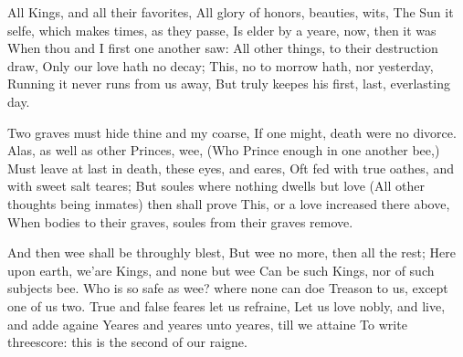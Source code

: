 \documentclass{book}
\newenvironment{poem}[1]%
  {\poemtitle{#1}%
   \Versus
   \numerus{1}%
  }
  {\endVersus}
\begin{document}
      
\begin{poem}{The Anniversarie} %
\Forma {}
    All Kings, and all their favorites,        
    All glory of honors, beauties, wits,        
  The Sun it selfe, which makes times, as they passe,  \auto
  Is elder by a yeare, now, then it was        
  When thou and I first one another saw:       
  All other things, to their destruction draw,        
    Only our love hath no decay;        
  This, no to morrow hath, nor yesterday,        
  Running it never runs from us away,        
  But truly keepes his first, last, everlasting day.       
       
    Two graves must hide thine and my coarse,        
    If one might, death were no divorce.        
  Alas, as well as other Princes, wee,        
  (Who Prince enough in one another bee,)        
  Must leave at last in death, these eyes, and eares,       
  Oft fed with true oathes, and with sweet salt teares;        
    But soules where nothing dwells but love        
  (All other thoughts being inmates) then shall prove        
  This, or a love increased there above,        
  When bodies to their graves, soules from their graves remove.       
       
    And then wee shall be throughly blest,        
    But wee no more, then all the rest;        
  Here upon earth, we'are Kings, and none but wee        
  Can be such Kings, nor of such subjects bee.        
  Who is so safe as wee? where none can doe       
  Treason to us, except one of us two.        
    True and false feares let us refraine,        
  Let us love nobly, and live, and adde againe        
  Yeares and yeares unto yeares, till we attaine        
  To write threescore: this is the second of our raigne.       
\end{poem}
      
\end{document}

